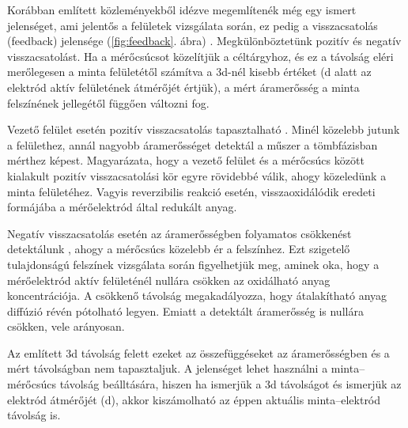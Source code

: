 Korábban említett közleményekből idézve megemlítenék még egy ismert jelenséget, ami jelentős a felületek vizsgálata során, ez pedig a visszacsatolás (feedback) jelensége (\ref{fig:feedback}. ábra) \cite{bard1989scanning}. Megkülönböztetünk pozitív és negatív visszacsatolást. Ha a mérőcsúcsot közelítjük a céltárgyhoz, és ez a távolság eléri merőlegesen a minta felületétől számítva a 3d-nél kisebb értéket (d alatt az elektród aktív felületének átmérőjét értjük), a mért áramerősség a minta felszínének jellegétől függően változni fog. 

Vezető felület esetén pozitív visszacsatolás tapasztalható \cite{bard1989scanning}. Minél közelebb jutunk a felülethez, annál nagyobb áramerősséget detektál a műszer a tömbfázisban mérthez képest.  Magyarázata, hogy a vezető felület és a mérőcsúcs között kialakult pozitív visszacsatolási kör egyre rövidebbé válik, ahogy közeledünk a minta felületéhez. Vagyis reverzibilis reakció esetén, visszaoxidálódik eredeti formájába a mérőelektród által redukált anyag. 

Negatív visszacsatolás esetén az áramerősségben folyamatos csökkenést detektálunk \cite{bard1989scanning}, ahogy a mérőcsúcs közelebb ér a felszínhez. Ezt szigetelő tulajdonságú felszínek vizsgálata során figyelhetjük meg, aminek oka, hogy a mérőelektród aktív felületénél nullára csökken az oxidálható anyag koncentrációja. A csökkenő távolság megakadályozza, hogy átalakítható anyag diffúzió révén pótolható legyen. Emiatt a detektált áramerősség is nullára csökken, vele arányosan.

Az említett 3d távolság felett ezeket az összefüggéseket az áramerősségben és a mért távolságban nem tapasztaljuk. A jelenséget lehet használni a minta--mérőcsúcs távolság beálltására, hiszen ha ismerjük a 3d távolságot és ismerjük az elektród átmérőjét (d), akkor kiszámolható az éppen aktuális minta--elektród távolság is.

